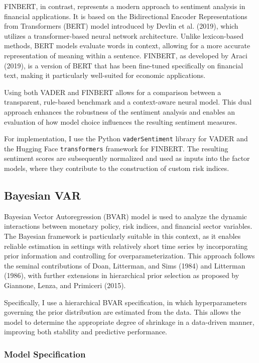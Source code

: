 \documentclass[12pt,a4paper]{report}
\begin{document}
FINBERT, in contrast, represents a modern approach to sentiment analysis in financial applications.
It is based on the Bidirectional Encoder Representations from Transformers (BERT) model introduced
by Devlin et al. (2019), which utilizes a transformer-based neural network architecture. Unlike
lexicon-based methods, BERT models evaluate words in context, allowing for a more accurate
representation of meaning within a sentence. FINBERT, as developed by Araci (2019), is a version of
BERT that has been fine-tuned specifically on financial text, making it particularly well-suited for
economic applications.

Using both VADER and FINBERT allows for a comparison between a transparent, rule-based benchmark and
a context-aware neural model. This dual approach enhances the robustness of the sentiment analysis
and enables an evaluation of how model choice influences the resulting sentiment measures.

For implementation, I use the Python \texttt{vaderSentiment} library for VADER and the Hugging Face
\texttt{transformers} framework for FINBERT. The resulting sentiment scores are subsequently
normalized and used as inputs into the factor models, where they contribute to the construction of
custom risk indices.

\subsection{Bayesian VAR}

Bayesian Vector Autoregression (BVAR) model is used to analyze the dynamic
interactions between monetary policy, risk indices, and financial sector variables. The Bayesian
framework is particularly suitable in this context, as it enables reliable estimation in settings
with relatively short time series by incorporating prior information and controlling for
overparameterization. This approach follows the seminal contributions of Doan, Litterman, and Sims
(1984) and Litterman (1986), with further extensions in hierarchical prior selection as proposed by
Giannone, Lenza, and Primiceri (2015).

Specifically, I use a hierarchical BVAR specification, in which hyperparameters governing the prior
distribution are estimated from the data. This allows the model to determine the appropriate degree
of shrinkage in a data-driven manner, improving both stability and predictive performance.

\subsubsection*{Model Specification}
\end{document}
